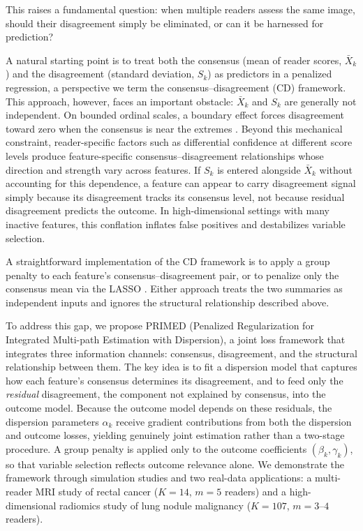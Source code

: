 \documentclass[referee,lineno,pdflatex,sn-vancouver-num]{sn-jnl}
\begin{document}
This raises a fundamental question: when multiple readers assess the same image, should their disagreement simply be eliminated, or can it be harnessed for prediction?

A natural starting point is to treat both the consensus (mean of reader scores, $\bar{X}_k$) and the disagreement (standard deviation, $S_k$) as predictors in a penalized regression, a perspective we term the consensus--disagreement (CD) framework.
This approach, however, faces an important obstacle: $\bar{X}_k$ and $S_k$ are generally not independent.
On bounded ordinal scales, a boundary effect forces disagreement toward zero when the consensus is near the extremes \cite{Taylor1961,Taylor2019}.
Beyond this mechanical constraint, reader-specific factors such as differential confidence at different score levels produce feature-specific consensus--disagreement relationships whose direction and strength vary across features.
If $S_k$ is entered alongside $\bar{X}_k$ without accounting for this dependence, a feature can appear to carry disagreement signal simply because its disagreement tracks its consensus level, not because residual disagreement predicts the outcome.
In high-dimensional settings with many inactive features, this conflation inflates false positives and destabilizes variable selection.

A straightforward implementation of the CD framework is to apply a group penalty \cite{Yuan2006} to each feature's consensus--disagreement pair, or to penalize only the consensus mean via the LASSO \cite{Tibshirani1996}.
Either approach treats the two summaries as independent inputs and ignores the structural relationship described above.

To address this gap, we propose PRIMED (Penalized Regularization for Integrated Multi-path Estimation with Dispersion), a joint loss framework that integrates three information channels: consensus, disagreement, and the structural relationship between them.
The key idea is to fit a dispersion model that captures how each feature's consensus determines its disagreement, and to feed only the \emph{residual} disagreement, the component not explained by consensus, into the outcome model.
Because the outcome model depends on these residuals, the dispersion parameters $\alpha_k$ receive gradient contributions from both the dispersion and outcome losses, yielding genuinely joint estimation rather than a two-stage procedure.
A group penalty is applied only to the outcome coefficients $(\beta_k, \gamma_k)$, so that variable selection reflects outcome relevance alone.
We demonstrate the framework through simulation studies and two real-data applications: a multi-reader MRI study of rectal cancer ($K = 14$, $m = 5$ readers) and a high-dimensional radiomics study of lung nodule malignancy ($K = 107$, $m = 3$--$4$ readers).
\end{document}
